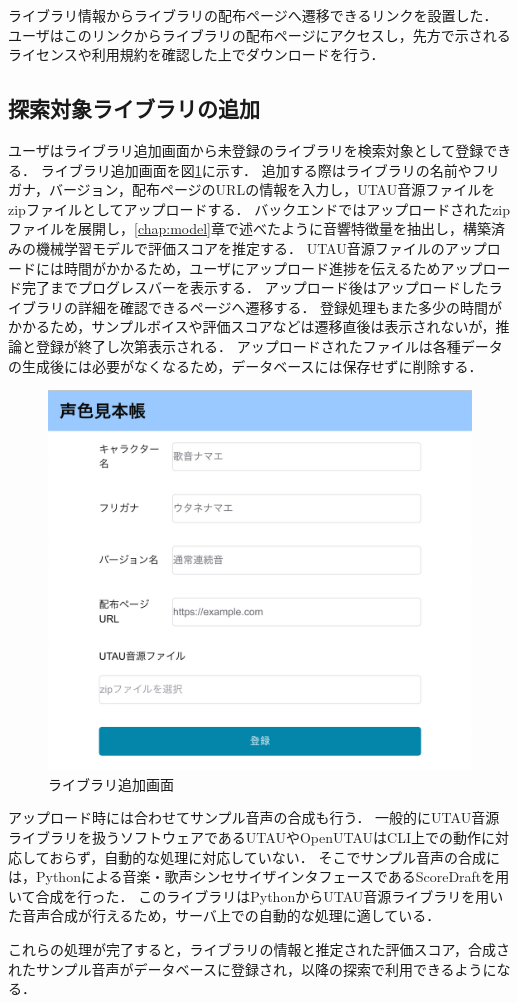 ライブラリ情報からライブラリの配布ページへ遷移できるリンクを設置した．
ユーザはこのリンクからライブラリの配布ページにアクセスし，先方で示されるライセンスや利用規約を確認した上でダウンロードを行う．

\subsection{探索対象ライブラリの追加}

ユーザはライブラリ追加画面から未登録のライブラリを検索対象として登録できる．
ライブラリ追加画面を図\ref{fig:site_upload_page}に示す．
追加する際はライブラリの名前やフリガナ，バージョン，配布ページのURLの情報を入力し，UTAU音源ファイルをzipファイルとしてアップロードする．
バックエンドではアップロードされたzipファイルを展開し，\ref{chap:model}章で述べたように音響特徴量を抽出し，構築済みの機械学習モデルで評価スコアを推定する．
UTAU音源ファイルのアップロードには時間がかかるため，ユーザにアップロード進捗を伝えるためアップロード完了までプログレスバーを表示する．
アップロード後はアップロードしたライブラリの詳細を確認できるページへ遷移する．
登録処理もまた多少の時間がかかるため，サンプルボイスや評価スコアなどは遷移直後は表示されないが，推論と登録が終了し次第表示される．
アップロードされたファイルは各種データの生成後には必要がなくなるため，データベースには保存せずに削除する．

\begin{figure}[htb]
  \centering
  \includegraphics[width=0.9\linewidth]{fig/site_upload_page.png}
  \caption{ライブラリ追加画面}
  \label{fig:site_upload_page}
\end{figure}

アップロード時には合わせてサンプル音声の合成も行う．
一般的にUTAU音源ライブラリを扱うソフトウェアであるUTAUやOpenUTAUはCLI上での動作に対応しておらず，自動的な処理に対応していない．
そこでサンプル音声の合成には，Pythonによる音楽・歌声シンセサイザインタフェースであるScoreDraftを用いて合成を行った．
このライブラリはPythonからUTAU音源ライブラリを用いた音声合成が行えるため，サーバ上での自動的な処理に適している．

これらの処理が完了すると，ライブラリの情報と推定された評価スコア，合成されたサンプル音声がデータベースに登録され，以降の探索で利用できるようになる．

